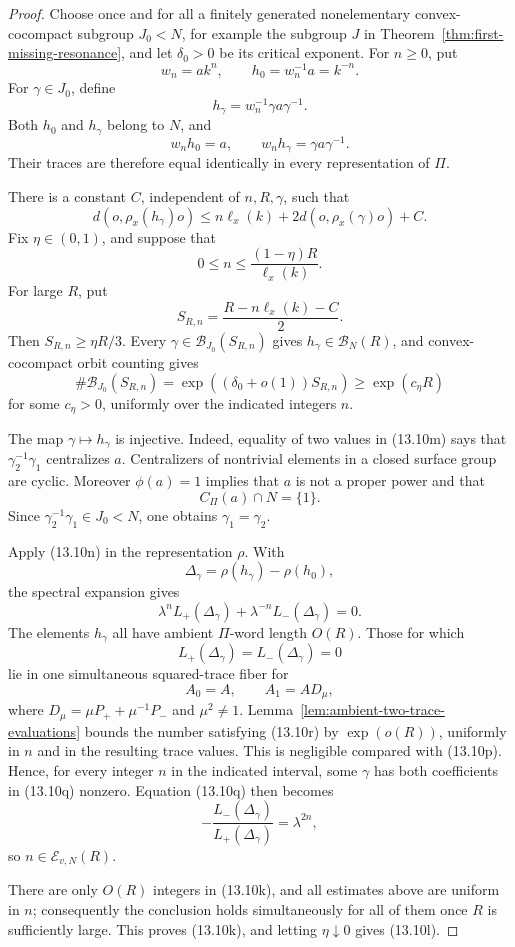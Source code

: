 \documentclass[11pt,reqno]{amsart}
\theoremstyle{definition}
\theoremstyle{remark}
\begin{document}
\begin{proof}
Choose once and for all a finitely generated nonelementary
convex-cocompact subgroup \(J_0<N\), for example the subgroup \(J\) in
Theorem~\ref{thm:first-missing-resonance}, and let \(\delta_0>0\) be its
critical exponent.  For \(n\ge0\), put
\[
 w_n=ak^n,\qquad h_0=w_n^{-1}a=k^{-n}.
\]
For \(\gamma\in J_0\), define
\[
 h_\gamma=w_n^{-1}\gamma a\gamma^{-1}.
\tag{13.10m}
\]
Both \(h_0\) and \(h_\gamma\) belong to \(N\), and
\[
 w_nh_0=a,\qquad
 w_nh_\gamma=\gamma a\gamma^{-1}.
\tag{13.10n}
\]
Their traces are therefore equal identically in every representation of
\(\Pi\).

There is a constant \(C\), independent of \(n,R,\gamma\), such that
\[
 d(o,\rho_x(h_\gamma)o)
 \le
 n\ell_x(k)+2d(o,\rho_x(\gamma)o)+C.
\tag{13.10o}
\]
Fix \(\eta\in(0,1)\), and suppose that
\[
 0\le n\le\frac{(1-\eta)R}{\ell_x(k)}.
\]
For large \(R\), put
\[
 S_{R,n}=\frac{R-n\ell_x(k)-C}{2}.
\]
Then \(S_{R,n}\ge\eta R/3\).  Every
\(\gamma\in\mathcal B_{J_0}(S_{R,n})\) gives
\(h_\gamma\in\mathcal B_N(R)\), and convex-cocompact orbit counting gives
\[
 \#\mathcal B_{J_0}(S_{R,n})
 =\exp((\delta_0+o(1))S_{R,n})
 \ge \exp(c_\eta R)
\tag{13.10p}
\]
for some \(c_\eta>0\), uniformly over the indicated integers \(n\).

The map \(\gamma\mapsto h_\gamma\) is injective.  Indeed, equality of two
values in (13.10m) says that \(\gamma_2^{-1}\gamma_1\) centralizes \(a\).
Centralizers of nontrivial elements in a closed surface group are cyclic.
Moreover \(\phi(a)=1\) implies that \(a\) is not a proper power and that
\[
 C_\Pi(a)\cap N=\{1\}.
\]
Since \(\gamma_2^{-1}\gamma_1\in J_0<N\), one obtains
\(\gamma_1=\gamma_2\).

Apply (13.10n) in the representation \(\rho\).  With
\[
 \Delta_\gamma=\rho(h_\gamma)-\rho(h_0),
\]
the spectral expansion gives
\[
 \lambda^nL_+(\Delta_\gamma)
 +\lambda^{-n}L_-(\Delta_\gamma)=0.
\tag{13.10q}
\]
The elements \(h_\gamma\) all have ambient \(\Pi\)-word length \(O(R)\).
Those for which
\[
 L_+(\Delta_\gamma)=L_-(\Delta_\gamma)=0
\tag{13.10r}
\]
lie in one simultaneous squared-trace fiber for
\[
 A_0=A,\qquad A_1=AD_\mu,
\]
where \(D_\mu=\mu P_++\mu^{-1}P_-\) and \(\mu^2\ne1\).
Lemma~\ref{lem:ambient-two-trace-evaluations} bounds the number satisfying
(13.10r) by \(\exp(o(R))\), uniformly in \(n\) and in the resulting trace
values.  This is negligible compared with (13.10p).  Hence, for every
integer \(n\) in the indicated interval, some \(\gamma\) has both
coefficients in (13.10q) nonzero.  Equation (13.10q) then becomes
\[
 -\frac{L_-(\Delta_\gamma)}{L_+(\Delta_\gamma)}
 =\lambda^{2n},
\]
so \(n\in\mathcal E_{v,N}(R)\).

There are only \(O(R)\) integers in (13.10k), and all estimates above are
uniform in \(n\); consequently the conclusion holds simultaneously for
all of them once \(R\) is sufficiently large.  This proves (13.10k), and
letting \(\eta\downarrow0\) gives (13.10l).
\end{proof}
\end{document}
